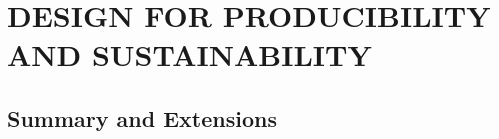 \chapter{DESIGN FOR PRODUCIBILITY AND SUSTAINABILITY}\label{chap:20}


\section{Summary and Extensions}

